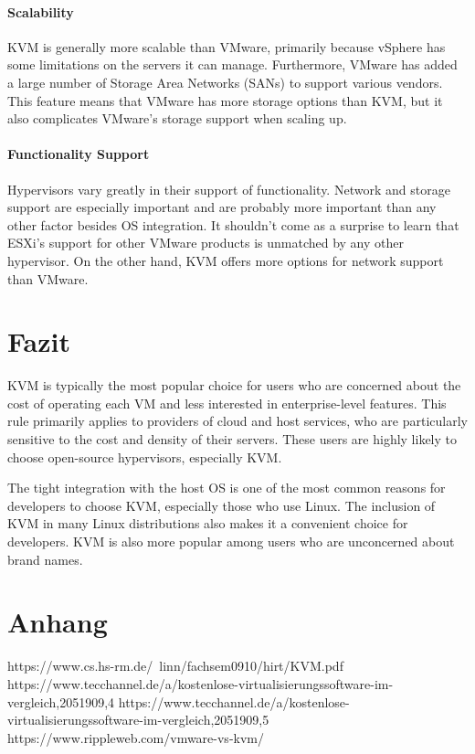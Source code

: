 \documentclass[14pt]{extreport}
\begin{document}
\subsubsection{Scalability}

KVM is generally more scalable than VMware, primarily because vSphere has some limitations on the servers it can manage. Furthermore, VMware has added a large number of Storage Area Networks (SANs) to support various vendors. This feature means that VMware has more storage options than KVM, but it also complicates VMware’s storage support when scaling up.
\subsubsection{Functionality Support}

Hypervisors vary greatly in their support of functionality. Network and storage support are especially important and are probably more important than any other factor besides OS integration. It shouldn’t come as a surprise to learn that ESXi’s support for other VMware products is unmatched by any other hypervisor. On the other hand, KVM offers more options for network support than VMware.


\chapter{Fazit}
KVM is typically the most popular choice for users who are concerned about the cost of operating each VM and less interested in enterprise-level features. This rule primarily applies to providers of cloud and host services, who are particularly sensitive to the cost and density of their servers. These users are highly likely to choose open-source hypervisors, especially KVM.

The tight integration with the host OS is one of the most common reasons for developers to choose KVM, especially those who use Linux. The inclusion of KVM in many Linux distributions also makes it a convenient choice for developers. KVM is also more popular among users who are unconcerned about brand names.
\chapter{Anhang}
\printbibliography


https://www.cs.hs-rm.de/~linn/fachsem0910/hirt/KVM.pdf
https://www.tecchannel.de/a/kostenlose-virtualisierungssoftware-im-vergleich,2051909,4
https://www.tecchannel.de/a/kostenlose-virtualisierungssoftware-im-vergleich,2051909,5
https://www.rippleweb.com/vmware-vs-kvm/
\end{document}
